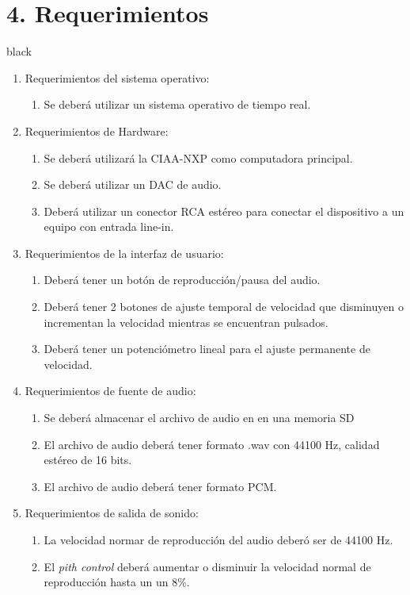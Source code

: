 \documentclass[11pt]{charter}
\begin{document}
\section{4. Requerimientos}
\label{sec:requerimientos}
\begin{consigna}{black}
\begin{enumerate}
\item Requerimientos del sistema operativo:
	\begin{enumerate}
	\item Se deberá utilizar un sistema operativo de tiempo real.
	\end{enumerate}
\item Requerimientos de Hardware:
	\begin{enumerate}
	\item Se deberá utilizará la CIAA-NXP como computadora principal.
	\item Se deberá utilizar un DAC de audio.
	\item Deberá utilizar un conector RCA estéreo para conectar el dispositivo a un equipo con entrada  line-in.
	\end{enumerate}
\item Requerimientos de la interfaz de usuario:
	\begin{enumerate}
	\item Deberá tener un botón de reproducción/pausa del audio.
	\item Deberá tener 2 botones de ajuste temporal de velocidad que disminuyen o incrementan la velocidad mientras se encuentran pulsados.
	\item Deberá tener un potenciómetro lineal para el ajuste permanente de velocidad.	
	\end{enumerate}
\item Requerimientos de fuente de audio:
	\begin{enumerate}
	\item Se deberá almacenar el archivo de audio en en una memoria SD
	\item El archivo de audio deberá tener formato .wav con 44100 Hz, calidad estéreo de 16 bits.
	\item El archivo de audio deberá tener formato PCM.
	\end{enumerate}
\item Requerimientos de salida de sonido:
	\begin{enumerate}
	\item La velocidad normar de reproducción del audio deberó ser de 44100 Hz.
	\item El \textit{pith control} deberá aumentar o disminuir la velocidad normal de reproducción hasta un un 8\%.

\end{enumerate}
\end{enumerate}
\end{consigna}
\end{document}
